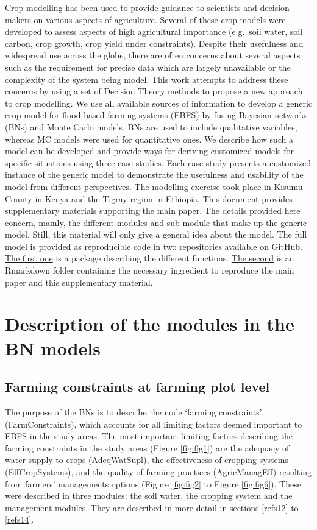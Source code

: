 \documentclass[]{elsarticle} %
\begin{document}
Crop modelling has been used to provide guidance to scientists and decision makers on various aspects of agriculture. Several of these crop models were developed to assess aspects of high agricultural importance (e.g.~soil water, soil carbon, crop growth, crop yield under constraints). Despite their usefulness and widespread use across the globe, there are often concerns about several aspects such as the requirement for precise data which are largely unavailable or the complexity of the system being model.
This work attempts to address these concerns by using a set of Decision Theory methods to propose a new approach to crop modelling. We use all available sources of information to develop a generic crop model for flood-based farming systems (FBFS) by fusing Bayesian networks (BNs) and Monte Carlo models. BNs are used to include qualitative variables, whereas MC models were used for quantitative ones. We describe how such a model can be developed and provide ways for deriving customized models for specific situations using three case studies. Each case study presents a customized instance of the generic model to demonstrate the usefulness and usability of the model from different perspectives. The modelling exercise took place in Kisumu County in Kenya and the Tigray region in Ethiopia. This document provides supplementary materials supporting the main paper. The details provided here concern, mainly, the different modules and sub-module that make up the generic model. Still, this material will only give a general idea about the model. The full model is provided as reproducible code in two repositories available on GitHub. \href{https://github.com/Issoufou-Liman/decisionSupportExtra}{The first one} is a package describing the different functions. \href{https://github.com/Issoufou-Liman/Modelling_FBFS}{The second} is an Rmarkdown folder containing the necessary ingredient to reproduce the main paper and this supplementary material.

\hypertarget{refs1}{%
\section{Description of the modules in the BN models}\label{refs1}}

\hypertarget{refs11}{%
\subsection{Farming constraints at farming plot level}\label{refs11}}

The purpose of the BNs is to describe the node `farming constraints' (FarmConstraints), which accounts for all limiting factors deemed important to FBFS in the study areas. The most important limiting factors describing the farming constraints in the study areas (Figure \ref{fig:fig1}) are the adequacy of water supply to crops (AdeqWatSupl), the effectiveness of cropping systems (EffCropSystems), and the quality of farming practices (AgricManagEff) resulting from farmers' managements options (Figure \ref{fig:fig2} to Figure \ref{fig:fig6}). These were described in three modules: the soil water, the cropping system and the management modules. They are described in more detail in sections \ref{refs12} to \ref{refs14}.
\end{document}
